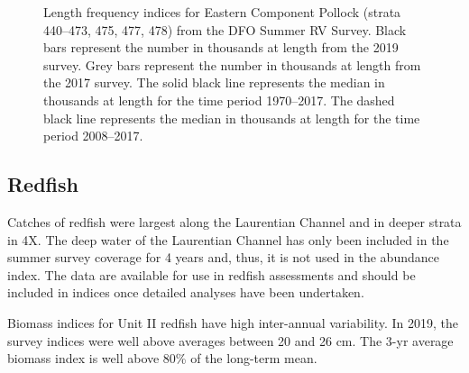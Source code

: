 \documentclass[11pt]{book}
\begin{document}
\begin{figure}[htb]

{\centering {} 

}

\caption{Length frequency indices for Eastern Component Pollock (strata 440--473, 475, 477, 478) from the DFO Summer RV Survey. Black bars represent the number in thousands at length from the 2019 survey. Grey bars represent the number in thousands at length from the 2017 survey. The solid black line represents the median in thousands at length for the time period 1970--2017. The dashed black line represents the median in thousands at length for the time period 2008--2017.}\label{fig:35-fig-pollock-lengthfreqEastern}
\end{figure}
\clearpage

\hypertarget{redfish}{%
\subsection{Redfish}\label{redfish}}

Catches of redfish were largest along the Laurentian Channel and in deeper strata in 4X. The deep water of the Laurentian Channel has only been included in the summer survey coverage for 4 years and, thus, it is not used in the abundance index. The data are available for use in redfish assessments and should be included in indices once detailed analyses have been undertaken.

Biomass indices for Unit II redfish have high inter-annual variability. In 2019, the survey indices were well above averages between 20 and 26 cm. The 3-yr average biomass index is well above 80\% of the long-term mean.
\end{document}
